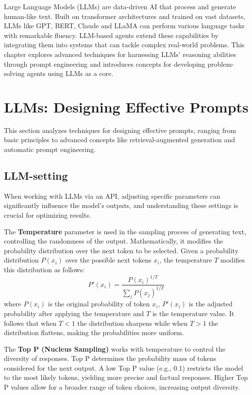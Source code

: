 Large Language Models (LLMs) are data-driven AI that process and generate human-like text. Built on transformer architectures and trained on vast datasets, LLMs like GPT, BERT, Claude and LLaMA can perform various language tasks with remarkable fluency. LLM-based agents extend these capabilities by integrating them into systems that can tackle complex real-world problems.
This chapter explores advanced techniques for harnessing LLMs' reasoning abilities through prompt engineering and introduces concepts for developing problem-solving agents using LLMs as a core.

\section{LLMs: Designing Effective Prompts}
\label{sec:effectiveprompts}
This section analyzes techniques for designing effective prompts, ranging from basic principles to advanced concepts like retrieval-augmented generation and automatic prompt engineering. 

\subsection{LLM-setting}
When working with LLMs via an API, adjusting specific parameters can significantly influence the model's outputs, and understanding these settings is crucial for optimizing results. 

The \textbf{Temperature} parameter is used in the sampling process of generating text, controlling the randomness of the output. Mathematically, it modifies the probability distribution over the next token to be selected. Given a probability distribution \( P(x_i) \) over the possible next tokens \( x_i \), the temperature \( T \) modifies this distribution as follows: \[
P'(x_i) = \frac{P(x_i)^{1/T}}{\sum_j P(x_j)^{1/T}}
\]
where \( P(x_i) \) is the original probability of token \( x_i \), \( P'(x_i) \) is the adjusted probability after applying the temperature and \( T \) is the temperature value.
It follows that when \( T < 1 \) the distribution sharpens while when \( T > 1 \) the distribution flattens, making the probabilities more uniform.

The \textbf{Top P (Nucleus Sampling)} works with temperature to control the diversity of responses. Top P determines the probability mass of tokens considered for the next output. A low Top P value (e.g., 0.1) restricts the model to the most likely tokens, yielding more precise and factual responses. Higher Top P values allow for a broader range of token choices, increasing output diversity.


